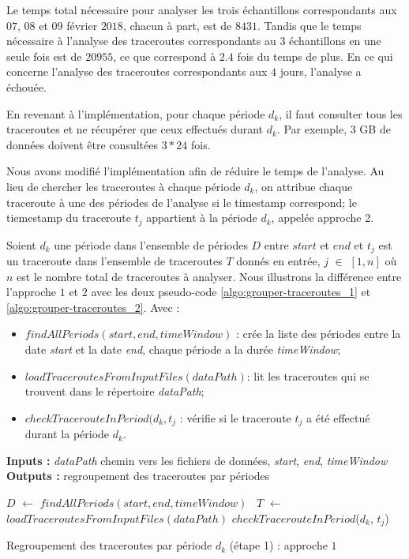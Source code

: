 Le temps total nécessaire pour analyser les trois échantillons correspondants aux  $ 07 $, $ 08 $ et $ 09 $ février $ 2018 $, chacun à part,  est de $ 8431 $. Tandis que le temps nécessaire à l'analyse des traceroutes correspondants au 3 échantillons en une seule fois est de $20955$, ce que correspond à $ 2.4 $ fois du temps de plus.
En ce qui concerne l'analyse des traceroutes correspondants aux $ 4 $ jours,  l'analyse a échouée. 

En revenant à l'implémentation, pour chaque période $d_k$, il faut consulter tous les traceroutes et ne récupérer que ceux effectués durant $d_k$. Par exemple, 3 GB de données doivent être consultées $ 3 * 24 $ fois. 


Nous avons modifié l'implémentation afin de réduire le temps de l'analyse. Au lieu de chercher les traceroutes à chaque période $d_k$,  on attribue chaque traceroute à une des périodes de l'analyse si le timestamp correspond; le tiemestamp du traceroute $t_{j}$ appartient à la période $d_k$, appelée approche 2.


Soient $d_k$ une période dans l'ensemble de périodes $D$  entre $ start $ et $ end $ et $t_{j}$ est un traceroute dans l'ensemble de traceroutes $T$ donnés en entrée, $j$ $\in$ $[1, n]$ où $n$ est le nombre total de traceroutes à analyser. Nous illustrons la différence entre l'approche $ 1 $ et $ 2 $ avec les deux pseudo-code \ref{algo:grouper-traceroutes_1} et 	\ref{algo:grouper-traceroutes_2}. Avec :

\begin{itemize}
	\item $ findAllPeriods(start, end, timeWindow)  $ : crée la liste des périodes entre la date  \textit{start} et la date \textit{end}, chaque période a la durée \textit{timeWindow};
	
	\item  $ loadTraceroutesFromInputFiles(dataPath)  $: lit les traceroutes qui se trouvent dans le répertoire  \textit{dataPath};
	
	\item   $ checkTracerouteInPeriod (d_k, t_{j}$ : vérifie si le traceroute $ t_{j}  $ a été effectué durant la période $d_k$.
\end{itemize}


\begin{algorithm}[H]
	\hspace*{\algorithmicindent} \textbf{Inputs :} \textit{dataPath} chemin vers les fichiers de données, \textit{start}, \textit{end}, \textit{timeWindow}\\
	\hspace*{\algorithmicindent} \textbf{Outputs :} regroupement des traceroutes par périodes
	\begin{algorithmic}[1]
	\State $D$ $\leftarrow$ $ findAllPeriods(start, end, timeWindow) $
	 \
	\State $T$ $\leftarrow$ \textit{$ loadTraceroutesFromInputFiles(dataPath) $}
	\ForAll{$t_{j}$ $\in$ $T$}
	\State $ checkTracerouteInPeriod $($d_k$, $t_{j}$) 
	\EndFor
	\EndFor
\end{algorithmic}
	\caption{Regroupement des traceroutes par période $d_k$ (étape 1) : approche $ 1 $}
	\label{algo:grouper-traceroutes_1}
\end{algorithm}


